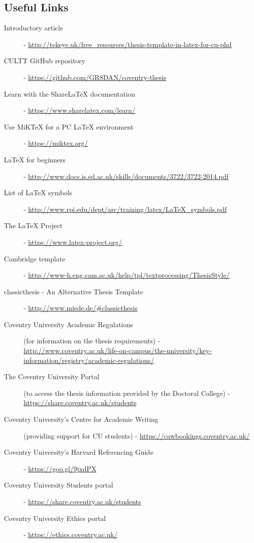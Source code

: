 \subsection*{Useful Links}
\begin{description}
\item[Introductory article] - \url{http://tekeye.uk/free_resources/thesis-template-in-latex-for-cu-phd}
\item[CULTT GitHub repository] - \url{https://github.com/GR8DAN/coventry-thesis}
\item[Learn with the ShareLaTeX documentation] - \url{https://www.sharelatex.com/learn/}
\item[Use MiKTeX for a PC \LaTeX{} environment] - \url{https://miktex.org/}
\item[\LaTeX{} for beginners] - \url{http://www.docs.is.ed.ac.uk/skills/documents/3722/3722-2014.pdf}
\item[List of LaTeX symbols] - \url{http://www.rpi.edu/dept/arc/training/latex/LaTeX_symbols.pdf}
\item[The \LaTeX{} Project] - \url{https://www.latex-project.org/}
\item[Cambridge template] - \url{http://www-h.eng.cam.ac.uk/help/tpl/textprocessing/ThesisStyle/}
\item[classicthesis - An Alternative Thesis Template] - \url{http://www.miede.de/#classicthesis}
\item[Coventry University Academic Regulations] (for information on the thesis requirements)
- \url{http://www.coventry.ac.uk/life-on-campus/the-university/key-information/registry/academic-regulations/}
\item[The Coventry University Portal] (to access the thesis information provided by the Doctoral College)
- \url{https://share.coventry.ac.uk/students}
\item[Coventry University's Centre for Academic Writing] (providing support for CU students) - \url{https://cawbookings.coventry.ac.uk/}
\item[Coventry University's Harvard Referencing Guide]
- \url{https://goo.gl/9jxdPX}
\item[Coventry University Students portal] - \url{https://share.coventry.ac.uk/students}
\item[Coventry University Ethics portal] - \url{https://ethics.coventry.ac.uk/}
\end{description}
